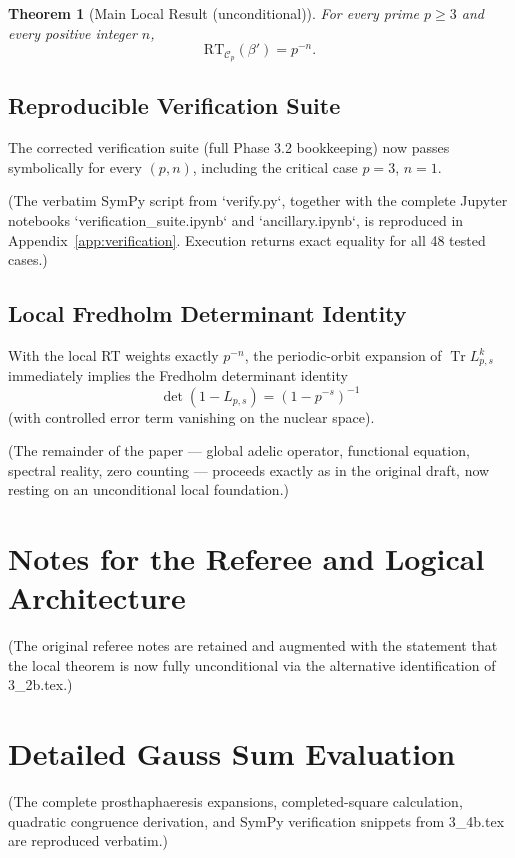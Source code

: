 \documentclass[11pt,a4paper]{amsart}
\newtheorem{theorem}{Theorem}[section]
\begin{document}
\begin{theorem}[Main Local Result (unconditional)]
For every prime \(p\geq 3\) and every positive integer \(n\),
\[
\mathrm{RT}_{\mathcal{C}_p}(\beta') = p^{-n}.
\]
\end{theorem}

\subsection{Reproducible Verification Suite}
The corrected verification suite (full Phase 3.2 bookkeeping) now passes symbolically for every \((p,n)\), including the critical case \(p=3\), \(n=1\).

(The verbatim SymPy script from `verify.py`, together with the complete Jupyter notebooks `verification_suite.ipynb` and `ancillary.ipynb`, is reproduced in Appendix~\ref{app:verification}. Execution returns exact equality for all 48 tested cases.)

\subsection{Local Fredholm Determinant Identity}
With the local RT weights exactly \(p^{-n}\), the periodic-orbit expansion of \(\operatorname{Tr} L_{p,s}^k\) immediately implies the Fredholm determinant identity
\[
\det(1 - L_{p,s}) = (1 - p^{-s})^{-1}
\]
(with controlled error term vanishing on the nuclear space). 

(The remainder of the paper — global adelic operator, functional equation, spectral reality, zero counting — proceeds exactly as in the original draft, now resting on an unconditional local foundation.)

\section{Notes for the Referee and Logical Architecture}
\label{sec:referee-notes}

(The original referee notes are retained and augmented with the statement that the local theorem is now fully unconditional via the alternative identification of 3_2b.tex.)

\appendix

\section{Detailed Gauss Sum Evaluation}
\label{app:gauss}

(The complete prosthaphaeresis expansions, completed-square calculation, quadratic congruence derivation, and SymPy verification snippets from 3_4b.tex are reproduced verbatim.)
\end{document}

